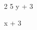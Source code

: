 \newcommand{\abc}{5}
\newcommand{\def}[2][x]{%
#1 + #2%
}
\renewcommand{%
\phi%
}{%
\theta%
}
\newcommand{\a}{\b{2}}
\renewcommand{\phi}{\a}
\newcommand{\b}[1]{#1}

\phi
\abc
\def[y]{3}
\def{3}
